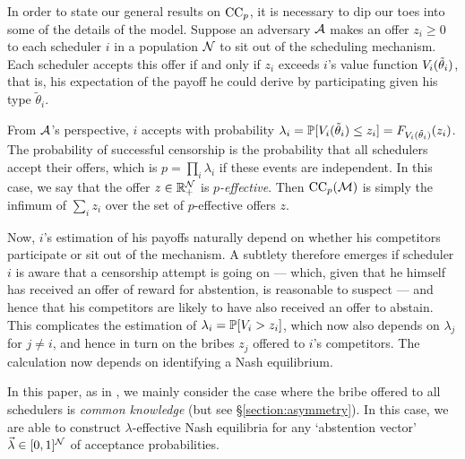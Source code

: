 In order to state our general results on $\mathrm{CC}_{p}$, it is necessary to dip our toes into some of the details of the model.
%
Suppose an adversary $\mathcal{A}$ makes an offer $z_i\geq 0$ to each scheduler $i$ in a population $\mathcal{N}$ to sit out of the scheduling mechanism.
%
Each scheduler accepts this offer if and only if $z_i$ exceeds $i$'s value function $V_i(\tilde\theta_i)$, that is, his expectation of the payoff he could derive by participating given his type $\tilde\theta_i$.

From $\mathcal{A}$'s perspective, $i$ accepts with probability $\lambda_i=\mathbb{P}[V_i(\tilde\theta_i)\leq z_i] = F_{V_i(\tilde\theta_i)}(z_i)$.
%
The probability of successful censorship is the probability that all schedulers accept their offers, which is $p=\prod_i\lambda_i$ if these events are independent.
%
In this case, we say that the offer $z\in\mathbb{R}_+^{\mathcal{N}}$ is \emph{$p$-effective}.
%
Then $\mathrm{CC}_{p}(\mathcal{M})$ is simply the infimum of $\sum_iz_i$ over the set of $p$-effective offers $z$.

Now, $i$'s estimation of his payoffs naturally depend on whether his competitors participate or sit out of the mechanism.
%
A subtlety therefore emerges if scheduler $i$ is aware that a censorship attempt is going on --- which, given that he himself has received an offer of reward for abstention, is reasonable to suspect --- and hence that his competitors are likely to have also received an offer to abstain.
%
This complicates the estimation of $\lambda_i=\mathbb{P}[V_i > z_i]$, which now also depends on $\lambda_j$ for $j\neq i$, and hence in turn on the bribes $z_j$ offered to $i$'s competitors.
%
The calculation now depends on identifying a Nash equilibrium.

In this paper, as in \cite{FPR}, we mainly consider the case where the bribe offered to all schedulers is \emph{common knowledge} (but see \S\ref{section:asymmetry}).
%
In this case, we are able to construct $\lambda$-effective Nash equilibria for any `abstention vector' $\vec{\lambda}\in[0,1]^{\mathcal{N}}$ of acceptance probabilities.


